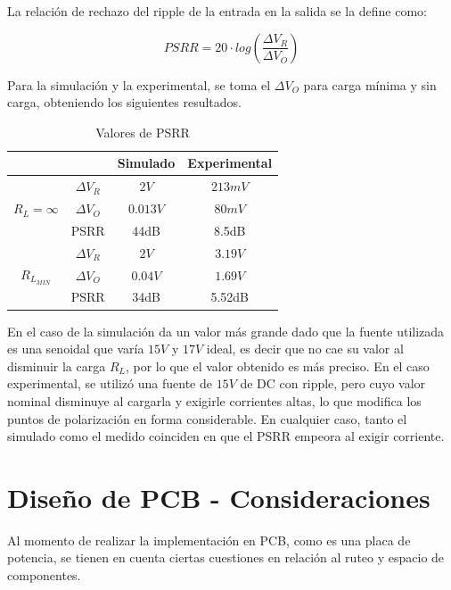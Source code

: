 La relaci\'on de rechazo del ripple de la entrada en la salida se la define como:

\[
PSRR = 20 \cdot log \left( \frac{\Delta V_R}{\Delta V_O} \right)
\]

Para la simulaci\'on y la experimental, se toma el $\Delta V_O$ para carga m\'inima y sin carga, obteniendo los siguientes resultados.

\begin{table}[!ht]
\centering
\begin{tabular}{|c|c|c|c|}
\hline
\multicolumn{2}{|c|}{}                         & Simulado & Experimental \\ \hline
\multirow{3}{*}{$R_L = \infty$} & $\Delta V_R$ &  $2V$    & $213mV$              \\ \cline{2-4} 
                                & $\Delta V_O$ &  $0.013V$& $80mV$             \\ \cline{2-4} 
                                & PSRR         &  44dB    & 8.5dB              \\ \hline
\multirow{3}{*}{$R_{L_{MIN}}$}  & $\Delta V_R$ &  $2V$    &  $3.19V$            \\ \cline{2-4} 
                                & $\Delta V_O$ &  $0.04V$ & $1.69V$              \\ \cline{2-4} 
                                & PSRR         &  34dB    &  5.52dB            \\ \hline
\end{tabular}
\caption{Valores de PSRR}

\end{table}

En el caso de la simulaci\'on da un valor m\'as grande dado que la fuente utilizada es una senoidal que var\'ia $15V$ y $17V$ ideal, es decir que no cae su valor al disminuir la carga $R_L$, por lo que el valor obtenido es m\'as preciso.
En el caso experimental, se utiliz\'o una fuente de $15V$ de DC con ripple, pero cuyo valor nominal disminuye al cargarla y exigirle corrientes altas, lo que modifica los puntos de polarizaci\'on en forma considerable.
En cualquier caso, tanto el simulado como el medido coinciden en que el PSRR empeora al exigir corriente.

\newpage

\section{Dise\~no de PCB - Consideraciones}

Al momento de realizar la implementaci\'on en PCB, como es una placa de potencia, se tienen en cuenta ciertas cuestiones en relaci\'on al ruteo y espacio de componentes.

